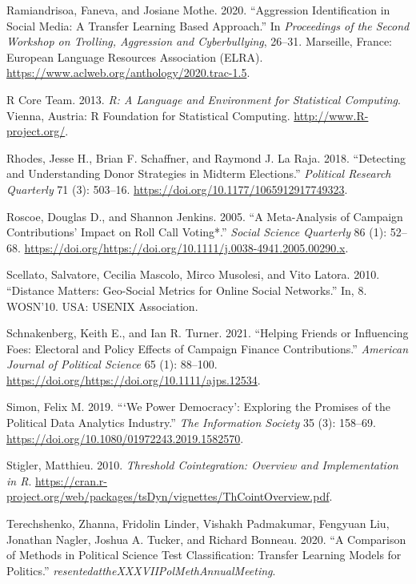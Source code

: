 \documentclass[12pt,]{article}
\begin{document}
\leavevmode\hypertarget{ref-ramiandrisoa2020}{}%
Ramiandrisoa, Faneva, and Josiane Mothe. 2020. ``Aggression
Identification in Social Media: A Transfer Learning Based Approach.'' In
\emph{Proceedings of the Second Workshop on Trolling, Aggression and
Cyberbullying}, 26--31. Marseille, France: European Language Resources
Association (ELRA).
\url{https://www.aclweb.org/anthology/2020.trac-1.5}.

\leavevmode\hypertarget{ref-r}{}%
R Core Team. 2013. \emph{R: A Language and Environment for Statistical
Computing}. Vienna, Austria: R Foundation for Statistical Computing.
\url{http://www.R-project.org/}.

\leavevmode\hypertarget{ref-rhodes2018}{}%
Rhodes, Jesse H., Brian F. Schaffner, and Raymond J. La Raja. 2018.
``Detecting and Understanding Donor Strategies in Midterm Elections.''
\emph{Political Research Quarterly} 71 (3): 503--16.
\url{https://doi.org/10.1177/1065912917749323}.

\leavevmode\hypertarget{ref-roscoe2005}{}%
Roscoe, Douglas D., and Shannon Jenkins. 2005. ``A Meta-Analysis of
Campaign Contributions' Impact on Roll Call Voting*.'' \emph{Social
Science Quarterly} 86 (1): 52--68.
\url{https://doi.org/https://doi.org/10.1111/j.0038-4941.2005.00290.x}.

\leavevmode\hypertarget{ref-scellato2010}{}%
Scellato, Salvatore, Cecilia Mascolo, Mirco Musolesi, and Vito Latora.
2010. ``Distance Matters: Geo-Social Metrics for Online Social
Networks.'' In, 8. WOSN'10. USA: USENIX Association.

\leavevmode\hypertarget{ref-schnakenberg2021}{}%
Schnakenberg, Keith E., and Ian R. Turner. 2021. ``Helping Friends or
Influencing Foes: Electoral and Policy Effects of Campaign Finance
Contributions.'' \emph{American Journal of Political Science} 65 (1):
88--100. \url{https://doi.org/https://doi.org/10.1111/ajps.12534}.

\leavevmode\hypertarget{ref-simon2019}{}%
Simon, Felix M. 2019. ```We Power Democracy': Exploring the Promises of
the Political Data Analytics Industry.'' \emph{The Information Society}
35 (3): 158--69. \url{https://doi.org/10.1080/01972243.2019.1582570}.

\leavevmode\hypertarget{ref-tsdyn}{}%
Stigler, Matthieu. 2010. \emph{Threshold Cointegration: Overview and
Implementation in R}.
\url{https://cran.r-project.org/web/packages/tsDyn/vignettes/ThCointOverview.pdf}.

\leavevmode\hypertarget{ref-terechshenko2020}{}%
Terechshenko, Zhanna, Fridolin Linder, Vishakh Padmakumar, Fengyuan Liu,
Jonathan Nagler, Joshua A. Tucker, and Richard Bonneau. 2020. ``A
Comparison of Methods in Political Science Test Classification: Transfer
Learning Models for Politics.''
\emph{resentedattheXXXVIIPolMethAnnualMeeting}.
\end{document}
